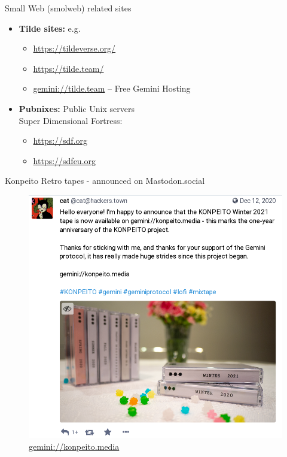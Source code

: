 \documentclass[presentation, 11pt,  aspectratio=169]{beamer}
\renewcommand{\alert}[1]{\textbf{\textcolor{mydarkred}{#1}}}
\begin{document}
\begin{frame}[label={sec:org323b731}]{Small Web (smolweb) related sites}
\begin{itemize}
\item \alert{Tilde sites:} e.g.\\
\begin{itemize}
\item \url{https://tildeverse.org/} \\
\item \url{https://tilde.team/} \\
\item \href{gemini://tilde.team}{gemini://tilde.team}  -- Free Gemini Hosting\\
\end{itemize}
\item \alert{Pubnixes:} Public Unix servers\\
Super Dimensional Fortress:\\
\begin{itemize}
\item \url{https://sdf.org}\\
\item \url{https://sdfeu.org}\\
\end{itemize}
\end{itemize}
\end{frame}


\begin{frame}[label={sec:org46722ee}]{Konpeito Retro tapes - announced on Mastodon.social}
\begin{figure}[htbp]
\centering
\includegraphics[height=0.75\textheight]{images/konpeito-1.png}
\caption{\href{gemini://konpeito.media}{gemini://konpeito.media}}
\end{figure}
\end{frame}
\end{document}
